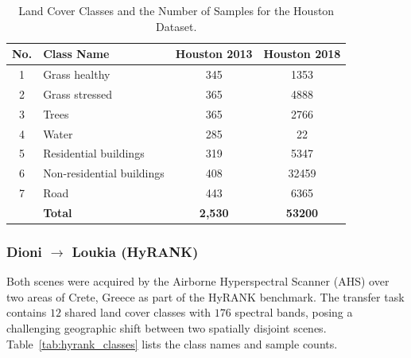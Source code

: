 \begin{table}[h]
\centering
\caption{Land Cover Classes and the Number of Samples for the Houston Dataset.}
\label{tab:houston_classes}
\begin{tabular}{clcc}
\toprule
\textbf{No.} & \textbf{Class Name} & \textbf{Houston 2013} & \textbf{Houston 2018} \\
\midrule
1 & Grass healthy              & 345   & 1353  \\
2 & Grass stressed             & 365   & 4888  \\
3 & Trees                      & 365   & 2766  \\
4 & Water                      & 285   & 22    \\
5 & Residential buildings      & 319   & 5347  \\
6 & Non-residential buildings  & 408   & 32459 \\
7 & Road                       & 443   & 6365  \\
\midrule
  & \textbf{Total}             & \textbf{2,530} & \textbf{53200} \\
\bottomrule
\end{tabular}
\end{table}



\subsubsection{Dioni $\to$ Loukia (HyRANK)}
Both scenes were acquired by the Airborne Hyperspectral Scanner (AHS) over two areas of Crete, Greece as part of the HyRANK benchmark. The transfer task contains $12$ shared land cover classes with $176$ spectral bands, posing a challenging geographic shift between two spatially disjoint scenes. Table~\ref{tab:hyrank_classes} lists the class names and sample counts.


